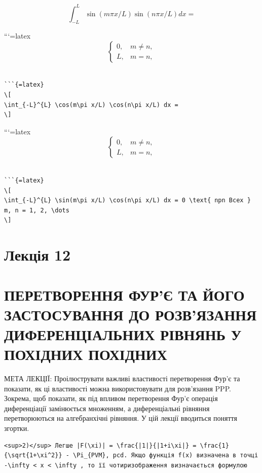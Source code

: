 \documentclass[
]{article}
\begin{document}
\[
\int_{-L}^{L} \sin(m\pi x/L) \sin(n\pi x/L) dx =
\]

```{=latex}
\[
\begin{cases} 0, & m \neq n, \\ L, &m = n, \end{cases}
\]

\begin{verbatim}

```{=latex}
\[
\int_{-L}^{L} \cos(m\pi x/L) \cos(n\pi x/L) dx =
\]
\end{verbatim}

```{=latex}
\[
\begin{cases} 0, & m \neq n, \\ L, &m = n, \end{cases}
\]

\begin{verbatim}

```{=latex}
\[
\int_{-L}^{L} \sin(m\pi x/L) \cos(n\pi x/L) dx = 0 \text{ npn Bcex } m, n = 1, 2, \dots
\]
\end{verbatim}

\section{Лекція 12}\label{ux43bux435ux43aux446ux456ux44f-12}

\section{ПЕРЕТВОРЕННЯ ФУР'Є ТА ЙОГО ЗАСТОСУВАННЯ ДО РОЗВ'ЯЗАННЯ
ДИФЕРЕНЦІАЛЬНИХ РІВНЯНЬ У ПОХІДНИХ
ПОХІДНИХ}\label{ux43fux435ux440ux435ux442ux432ux43eux440ux435ux43dux43dux44f-ux444ux443ux440ux454-ux442ux430-ux439ux43eux433ux43e-ux437ux430ux441ux442ux43eux441ux443ux432ux430ux43dux43dux44f-ux434ux43e-ux440ux43eux437ux432ux44fux437ux430ux43dux43dux44f-ux434ux438ux444ux435ux440ux435ux43dux446ux456ux430ux43bux44cux43dux438ux445-ux440ux456ux432ux43dux44fux43dux44c-ux443-ux43fux43eux445ux456ux434ux43dux438ux445-ux43fux43eux445ux456ux434ux43dux438ux445}

МЕТА ЛЕКЦІЇ: Проілюструвати важливі властивості перетворення Фур'є та
показати, як ці властивості можна використовувати для розв'язання PPP.
Зокрема, щоб показати, як під впливом перетворення Фур'є операція
диференціації замінюється множенням, а диференціальні рівняння
перетворюються на алгебранхічні рівняння. У цій лекції вводиться поняття
згортки.

\begin{verbatim}
<sup>2)</sup> Легше |F(\xi)| = \frac{|1|}{|1+i\xi|} = \frac{1}{\sqrt{1+\xi^2}} - \Pi_{PVM}, pcd. Якщо функція f(x) визначена в точці -\infty < x < \infty , то її чотиризображення визначається формулою
\end{verbatim}
\end{document}
